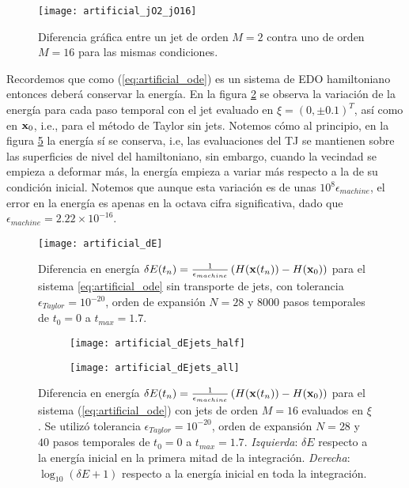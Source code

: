 \begin{figure}[h!]
 \centering
 \texttt{[image: artificial\_jO2\_jO16]}
 \caption{Diferencia gráfica entre un jet de orden $M=2$ contra uno de orden $M=16$ para las mismas condiciones.}
 \label{fig:artificial_jO2_jO16}
\end{figure}

Recordemos que como (\ref{eq:artificial_ode}) es un sistema de EDO hamiltoniano entonces deberá conservar la energía. En la figura \ref{fig:artificial_dE} se observa la variación de la energía para cada paso temporal con el jet evaluado en $\xi = (0,\pm 0.1)^T$, así como en $\mathbf{x}_0$, i.e., para el método de Taylor sin jets. Notemos cómo al principio, en la figura \ref{fig:artificial_dEjets} la energía sí se conserva, i.e, las evaluaciones del TJ se mantienen sobre las superficies de nivel del hamiltoniano, sin embargo, cuando la vecindad se empieza a deformar más, la energía empieza a variar más respecto a la de su condición inicial. Notemos que aunque esta variación es de unas $10^8 \epsilon_{machine}$, el error en la energía es apenas en la octava cifra significativa, dado que $\epsilon_{machine} = 2.22\times 10^{-16}$.

\begin{figure}[h!]
 \centering
 \texttt{[image: artificial\_dE]}
 \caption{Diferencia en energía $\delta E(t_n) = \frac{1}{\epsilon_{machine}} \left( H(\mathbf{x}(t_n)) - H(\mathbf{x}_0) \right)$ para el sistema \ref{eq:artificial_ode} sin transporte de jets, con tolerancia $\epsilon_{Taylor} = 10^{-20}$, orden de expansión $N = 28$ y $8000$ pasos temporales de $t_0 = 0$ a $t_{max} = 1.7$.}
 \label{fig:artificial_dE}
\end{figure}

\begin{figure}[h!]
\centering
\begin{subfigure}{0.49\textwidth}
	\centering
	\texttt{[image: artificial\_dEjets\_half]}
	\label{fig:artificial_dEjets_half}
\end{subfigure}
%
\begin{subfigure}{0.49\textwidth}
	\centering
	\texttt{[image: artificial\_dEjets\_all]}
	\label{fig:artificial_dEjets_all}
\end{subfigure}
\caption{Diferencia en energía $\delta E(t_n) = \frac{1}{\epsilon_{machine}} \left( H(\mathbf{x}(t_n)) - H(\mathbf{x}_0) \right)$ para el sistema (\ref{eq:artificial_ode}) con jets de orden $M=16$ evaluados en $\xi$. Se utilizó tolerancia $\epsilon_{Taylor} = 10^{-20}$, orden de expansión $N = 28$ y $40$ pasos temporales de $t_0 = 0$ a $t_{max} = 1.7$. \textit{Izquierda}: $\delta E$ respecto a la energía inicial en la primera mitad de la integración. \textit{Derecha}:  $\log_10(\delta E + 1)$ respecto a la energía inicial en toda la integración. }
\label{fig:artificial_dEjets}
\end{figure}


